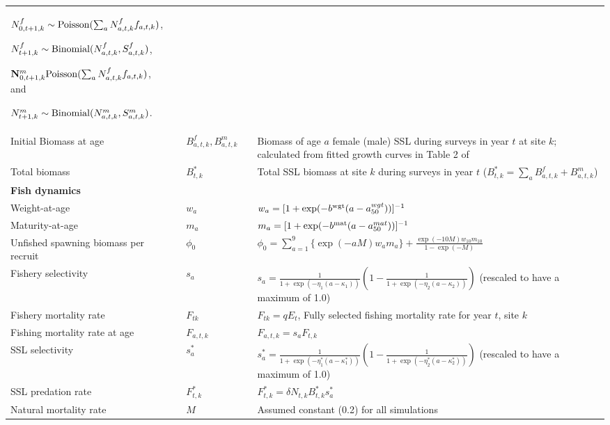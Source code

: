 \documentclass[11pt]{article}
\begin{document}
\begin{longtable}{p{4cm}lll p{8cm}}
$N_{0,t+1,k}^f \sim {\rm Poisson}(\sum_a N_{a,t,k}^ff_{a,t,k})$,

$N_{t+1,k}^f \sim {\rm Binomial}(N_{a,t,k}^f,S_{a,t,k}^f)$,

${\bf N}_{0,t+1,k}^{m} {\rm Poisson}(\sum_a N_{a,t,k}^f f_{a,t,k})$, and

$N_{t+1,k}^{m} \sim {\rm Binomial}(N_{a,t,k}^{m},S_{a,t,k}^{m})$. \\
Initial
Biomass at age & & $B_{a,t,k}^f,B_{a,t,k}^{m}$ & & Biomass of age $a$ female (male) SSL during surveys in year $t$ at site $k$; calculated from fitted growth curves in Table 2 of \citet{WinshipEtAl2001}\\
Total biomass & & $B_{t,k}^*$ & & Total SSL biomass at site $k$ during surveys in year $t$ ($B_{t,k}^*=\sum_a B_{a,t,k}^f+B_{a,t,k}^{m}$) \\
\midrule
\multicolumn{1}{l}{\textbf{Fish dynamics}}\\
Weight-at-age & & $w_a$ & & $w_a = [ 1 + \exp(-b^{\rm wgt}(a-a_{50}^{wgt})) ]^{-1}$ \\
Maturity-at-age & & $m_a$ & & $m_a = [ 1 + \exp(-b^{\rm mat}(a-a_{50}^{mat})) ]^{-1}$ \\
Unfished spawning biomass per recruit & & $\phi_0$ & & $\phi_0=\sum_{a=1}^9 \{ \exp(-aM) w_a m_a \} + \frac{\exp(-10M) w_{10} m_{10}}{1-\exp(-M)}$ \\

Fishery selectivity  & & $s_a$ & &  $s_a = \frac{1}{1+\exp(-\eta_1(a-\kappa_1))} \left( 1- \frac{1}{1+\exp(-\eta_2(a-\kappa_2))} \right)$ (rescaled to have a maximum of 1.0)\\

Fishery mortality rate & & $F_{tk}$ & & $F_{tk}=q E_t$, Fully selected fishing mortality rate for year $t$, site $k$\\

Fishing mortality rate at age & & $F_{a,t,k}$ & & $F_{a,t,k}=s_a F_{t,k}$ \\

SSL selectivity  & & $s_a^*$ & &  $s_a^* = \frac{1}{1+\exp(-\eta_1^*(a-\kappa_1^*))} \left( 1- \frac{1}{1+\exp(-\eta_2^*(a-\kappa_2^*))} \right)$ (rescaled to have a maximum of 1.0)\\

SSL predation rate  & & $F_{t,k}^*$ & & $F_{t,k}^*=\delta N_{t,k} B_{t,k}^* s_a^*$ \\

Natural mortality rate & & $M$ & & Assumed constant (0.2) for all simulations \\


\end{longtable}
\end{document}
